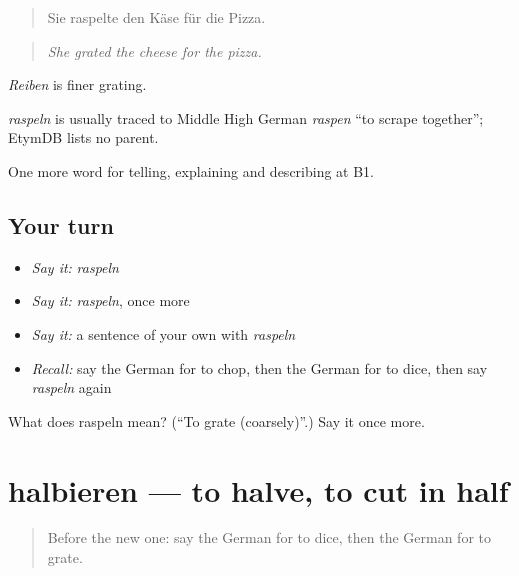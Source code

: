 \begin{quote}
Sie raspelte den Käse für die Pizza.
\end{quote}

\begin{quote}
\emph{She grated the cheese for the pizza.}
\end{quote}

\emph{Reiben} is finer grating.

\begin{cousinweb}
\emph{raspeln} is usually traced to Middle High German \emph{raspen} \textquotedblleft{}to scrape together\textquotedblright{}; EtymDB lists no parent.
\end{cousinweb}

\begin{grammarlens}[title={What you've built}]
One more word for telling, explaining and describing at B1.
\end{grammarlens}

\subsection*{Your turn}
\begin{itemize}
\raggedright
  \item \emph{Say it:} \emph{raspeln}
  \item \emph{Say it:} \emph{raspeln}, once more
  \item \emph{Say it:} a sentence of your own with \emph{raspeln}
  \item \emph{Recall:} say the German for to chop, then the German for to dice, then say \emph{raspeln} again
\end{itemize}

\begin{tcolorbox}[breakable,colback=teal!4,colframe=teal!35!black,title={Before you move on}]
What does raspeln mean? (\textquotedblleft{}To grate (coarsely)\textquotedblright{}.) Say it once more.
\end{tcolorbox}
\section[halbieren]{halbieren — to halve, to cut in half}

\label{lesson:GE-C323-halbieren}



\begin{quote}
Before the new one: say the German for to dice, then the German for to grate.
\end{quote}

